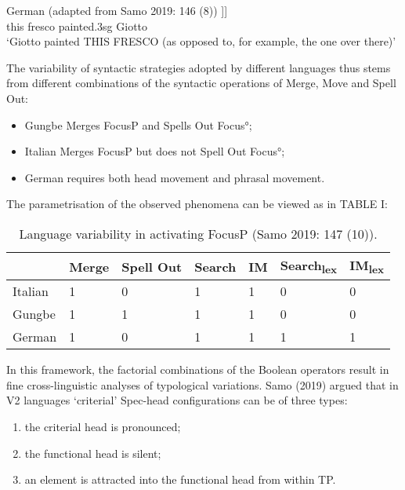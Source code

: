 \documentclass[fleqn,10pt]{wlscirep}
\begin{document}
\begin{exe}
    \ex	German (adapted from Samo 2019: 146 (8))
		\gll [\textsubscript{SpecFoc} 	DIESES 	FRESKO 	[\textsubscript{Focus^0} 	malte				[	Giotto ]]]\\
		{} this 			fresco			{}		painted.3sg	{}	Giotto \\
        \vspace*{-3mm}
		\glt ‘Giotto painted THIS FRESCO (as opposed to, for example, the one over there)’
\end{exe}

The variability of syntactic strategies adopted by different languages thus stems from different combinations of the syntactic operations of Merge, Move and Spell Out: 

\begin{itemize}
\item Gungbe Merges FocusP and Spells Out Focus°; 
\item \vspace*{-2mm} Italian Merges FocusP but does not Spell Out Focus°; 
\item \vspace*{-2mm} German requires both head movement and phrasal movement. 
\end{itemize}

The parametrisation of the observed phenomena can be viewed as in TABLE I:

\begin{table}[ht]
    \centering
    \begin{tabular}{|l|l|l|l|l|l|l|}
    \hline
     & Merge & Spell Out & Search & IM & Search\textsubscript{lex} & IM\textsubscript{lex} \\
    \hline
    Italian & 1 & 0 & 1 & 1 & 0 & 0 \\
    \hline
    Gungbe & 1 & 1 & 1 & 1 & 0 & 0 \\
    \hline
    German & 1 & 0 & 1 & 1 & 1 & 1 \\
    \hline
    \end{tabular}
    \caption{\label{tab:samp}Language variability in activating FocusP (Samo 2019: 147 (10)).}
    \end{table}

In this framework, the factorial combinations of the Boolean operators result in fine cross-linguistic analyses of typological variations. Samo (2019) argued that in V2 languages ‘criterial’ Spec-head configurations can be of three types: 

\begin{enumerate}[i]
    \item the criterial head is pronounced; 
    \item \vspace*{-2mm} the functional head is silent; 
    \item \vspace*{-2mm} an element is attracted into the functional head from within TP. 
\end{enumerate}
\end{document}
